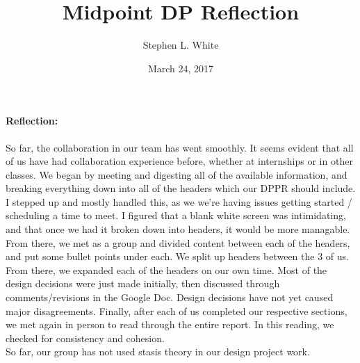 \documentclass[11pt]{article}
\title{Midpoint DP Reflection}
\author{Stephen L. White}
\date{March 24, 2017}
\begin{document}
\paragraph{Reflection:}

So far, the collaboration in our team has went smoothly. It seems evident that all of us have had collaboration experience before, whether at internships or in other classes. We began by meeting and digesting all of the available information, and breaking everything down into all of the headers which our DPPR should include. I stepped up and mostly handled this, as we we're having issues getting started / scheduling a time to meet. I figured that a blank white screen was intimidating, and that once we had it broken down into headers, it would be more managable. From there, we met as a group and divided content between each of the headers, and put some bullet points under each. We split up headers between the 3 of us. From there, we expanded each of the headers on our own time. Most of the design decisions were just made initially, then discussed through comments/revisions in the Google Doc. Design decisions have not yet caused major disagreements. Finally, after each of us completed our respective sections, we met again in person to read through the entire report. In this reading, we checked for consistency and cohesion. \\

So far, our group has not used stasis theory in our design project work.
\end{document}
